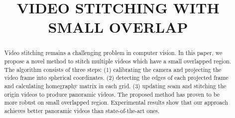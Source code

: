 \documentclass[conference]{IEEEtran}
\begin{document}
\title{VIDEO STITCHING WITH SMALL OVERLAP\\
}

\author{
\and
{}
}

\maketitle

\begin{abstract}
Video stitching remains a challenging problem in computer vision. In this paper, we propose a novel method to stitch multiple videos which have a small overlapped region.
The algorithm consists of three steps: (1) calibrating the camera and projecting the video frame into spherical coordinates. (2) detecting the edges of each projected frame 
and calculating homegraphy matrix in each grid. (3) updating seam and stitching the origin videos to produce panoramic videos. The proposed method has proven to be
more robust on small overlapped region. Experimental results show that our approach achieves better panoramic videos than state-of-the-art ones.
\end{abstract}
\end{document}
